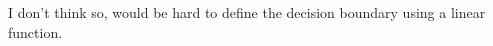 \begin{answer}
    I don't think so, would be hard to define the decision boundary using a linear function.
\end{answer}
